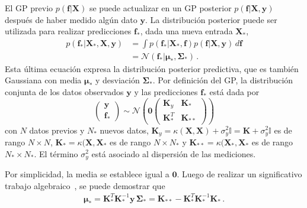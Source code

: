 El GP previo $p(\mathbf{f}|\mathbf{X})$ se puede actualizar en un GP
posterior $p(\mathbf{f}|\mathbf{X},\mathbf{y})$ después de haber medido
algún dato $\mathbf{y}$. La distribución posterior puede ser utilizada 
para realizar predicciones $\mathbf{f}_*$, dada una nueva entrada 
$\mathbf{X}_*$,
\begin{eqnarray}
p(\mathbf{f}_*|\mathbf{X}_*,\mathbf{X},\mathbf{y})
&=\int p(\mathbf{f}_*|\mathbf{X}_*,\mathbf{f}) p(\mathbf{f}|\mathbf{X},
\mathbf{y})\,d\mathbf{f} \\
&=\mathcal{N}(\mathbf{f}_*|\boldsymbol\mu_*,\boldsymbol\Sigma_*)\,.
\end{eqnarray}
Esta última ecuación expresa la distribución posterior predictiva, que 
es también Gaussiana con media $\boldsymbol\mu_*$ y desviación 
$\boldsymbol\Sigma_*$. Por definición del GP, la distribución conjunta
de los datos observados $\mathbf{y}$ y las predicciones $\mathbf{f}_*$ 
está dada por
\begin{equation}
\left(\begin{array}{c}
\mathbf{y}\\
\mathbf{f}_*
\end{array} 
\right)\sim\mathcal{N}\left(\mathbf{0}
\left(
\begin{array}{cc}
\mathbf{K}_y & \mathbf{K}_* \\
\mathbf{K}_*^T & \mathbf{K}_{**}
\end{array}
\right)
\right)
\end{equation}
con $N$ datos previos y $N_*$ nuevos datos, 
$\mathbf{K}_y=\kappa(\mathbf{X},\mathbf{X})+\sigma_y^2\mathbb{I} = 
\mathbf{K}+\sigma_y^2\mathbb{I}$ es de rango $N\times N$, 
$\mathbf{K}_*=\kappa(\mathbf{X},\mathbf{X}_*$ es de rango $N\times N_*$
y $\mathbf{K}_{**}=\kappa(\mathbf{X}_*,\mathbf{X}_*$ es de rango 
$N_*\times N_*$. El término $\sigma_y^2$ está asociado al dispersión de 
las mediciones.

Por simplicidad, la media se establece igual a $\mathbf{0}$. Luego de
realizar un significativo trabajo algebraico~\cite{}, se puede demostrar 
que
\begin{eqnarray}
\boldsymbol\mu_*=\mathbf{K}_*^T\mathbf{K}_*^{-1}\mathbf{y}\,
\boldsymbol\Sigma_*=\mathbf{K}_{**}-\mathbf{K}_*^T\mathbf{K}_*^{-1}
\mathbf{K}_*\,.
\end{eqnarray}


